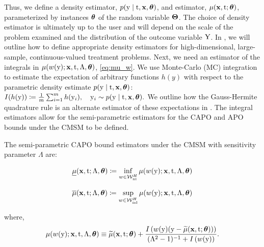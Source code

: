 Thus, we define a density estimator, $p(\mathrm{y} \mid \mathrm{t}, \mathbf{x}, \bm{\theta})$, and estimator, $\mu(\mathbf{x}, \mathrm{t}; \bm{\theta})$, parameterized by instances $\bm{\theta}$ of the random variable $\bm{\Theta}$.
The choice of density estimator is ultimately up to the user and will depend on the scale of the problem examined and the distribution of the outcome variable $\mathrm{Y}$. 
In , we will outline how to define appropriate density estimators for high-dimensional, large-sample, continuous-valued treatment problems.
Next, we need an estimator of the integrals in $\mu(w(\mathrm{y}); \mathbf{x}, \mathrm{t}, \Lambda, \bm{\theta})$, \cref{eq:mu_w}. 
We use Monte-Carlo (MC) integration to estimate the expectation of arbitrary functions $h(y)$ with respect to the parametric density estimate $p(\mathrm{y} \mid \mathrm{t}, \mathbf{x}, \bm{\theta})$:
$
    I(h(\mathrm{y})) \coloneqq \frac{1}{m} \sum_{i=1}^m h(\mathrm{y}_i), \quad \mathrm{y}_i \sim p(\mathrm{y} \mid \mathrm{t}, \mathbf{x}, \bm{\theta}).
$
We outline how the Gauss-Hermite quadrature rule is an alternate estimator of these expectations in . The integral estimators allow for the semi-parametric estimators for the CAPO and APO bounds under the CMSM to be defined.

The semi-parametric CAPO bound estimators under the CMSM with sensitivity parameter $\Lambda$ are:
\noindent
\begin{minipage}{.5\linewidth}
    \begin{equation}
        \label{eq:CAPO_lower_param}
        \underline{\mu}(\mathbf{x}, \mathrm{t}; \Lambda, \bm{\theta}) \coloneqq \inf_{w \in \mathcal{W}_{\textrm{ni}}^{H}} \mu(w(\mathrm{y}); \mathbf{x}, \mathrm{t}, \Lambda, \bm{\theta})
    \end{equation}
\end{minipage}%
\begin{minipage}{.5\linewidth}
    \begin{equation}
        \label{eq:CAPO_upper_param}
        \overline{\mu}(\mathbf{x}, \mathrm{t}; \Lambda, \bm{\theta}) \coloneqq \sup_{w \in \mathcal{W}_{\textrm{nd}}^{H}} \mu(w(\mathrm{y}); \mathbf{x}, \mathrm{t}, \Lambda, \bm{\theta})
    \end{equation}
\end{minipage}
where,
\begin{equation*}
    \mu(w(\mathrm{y}); \mathbf{x}, \mathrm{t}, \Lambda, \bm{\theta}) 
    \equiv \widetilde{\mu}(\mathbf{x}, \mathrm{t}; \bm{\theta}) + \frac{I\left( w(\mathrm{y}) (\mathrm{y} - \widetilde{\mu}(\mathbf{x}, \mathrm{t}; \bm{\theta})) \right)}{(\Lambda^2 - 1)^{-1} + I\left( w(\mathrm{y}) \right)}.
\end{equation*}

